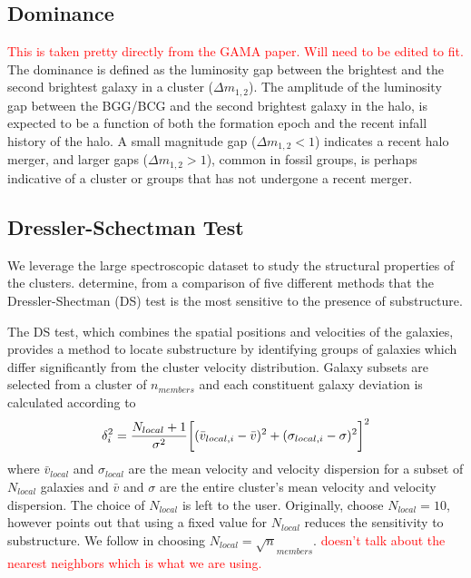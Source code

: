 \documentclass[apj, revtex4]{emulateapj}
\newcommand{\editorial}[1]{\textcolor{red}{#1} }
\begin{document}
\subsection{Dominance}
\editorial{This is taken pretty directly from the GAMA paper. Will need to be edited to fit.}
The dominance is defined as the luminosity gap between the brightest and the second brightest galaxy in a cluster ($\Delta m_{1, 2}$). The amplitude of the luminosity gap between the BGG/BCG and the second brightest galaxy in the halo, is expected to be a function of both the formation epoch and the recent infall history of the halo. A small magnitude gap ($\Delta m_{1, 2} < 1$) indicates a recent halo merger, and larger gaps ($\Delta m_{1, 2} > 1$), common in fossil groups, is perhaps indicative of a cluster or groups that has not undergone a recent merger.

\subsection{Dressler-Schectman Test}
We leverage the large spectroscopic dataset to study the structural properties of the clusters. \cite{Pinkney1996} determine, from a comparison of five different methods that the Dressler-Shectman (DS) test \citep{Dressler1988} is the most sensitive to the presence of substructure.

The DS test, which combines the spatial positions and velocities of the galaxies, provides a method to locate substructure by identifying groups of galaxies which differ significantly from the cluster velocity distribution. Galaxy subsets are selected from a cluster of $n_{members}$ and each constituent galaxy deviation is calculated according to
\begin{equation}
	\delta_i^2 = \frac{N_{local}+1}{\sigma^2}\bigg{[}(\bar{v}_{local,i} - \bar{v})^2 + (\sigma_{local,i} - \sigma)^2\bigg{]}^2
\end{equation}
where $\bar{v}_{local}$ and $\sigma_{local}$ are the mean velocity and velocity dispersion for a subset of $N_{local}$ galaxies and $\bar{v}$ and $\sigma$ are the entire cluster's mean velocity and velocity dispersion. The choice of $N_{local}$ is left to the user. Originally, \cite{Dressler1988} choose $N_{local}=10$, however \cite{Bird1994} points out that using a fixed value for $N_{local}$ reduces the sensitivity to substructure. We follow \cite{Bird1994} in choosing $N_{local} = \sqrt n_{members}$. \editorial{doesn't talk about the nearest neighbors which is what we are using.}
\end{document}
